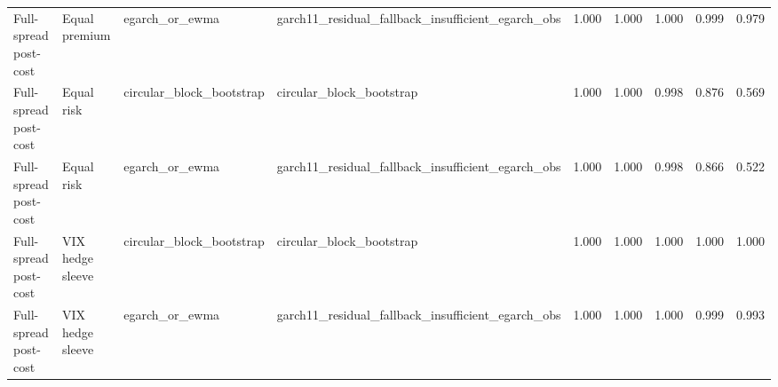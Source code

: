 \begin{tabular}{llllrrrrr}
Full-spread post-cost & Equal premium & egarch\_or\_ewma & garch11\_residual\_fallback\_insufficient\_egarch\_obs & 1.000 & 1.000 & 1.000 & 0.999 & 0.979 \\
Full-spread post-cost & Equal risk & circular\_block\_bootstrap & circular\_block\_bootstrap & 1.000 & 1.000 & 0.998 & 0.876 & 0.569 \\
Full-spread post-cost & Equal risk & egarch\_or\_ewma & garch11\_residual\_fallback\_insufficient\_egarch\_obs & 1.000 & 1.000 & 0.998 & 0.866 & 0.522 \\
Full-spread post-cost & VIX hedge sleeve & circular\_block\_bootstrap & circular\_block\_bootstrap & 1.000 & 1.000 & 1.000 & 1.000 & 1.000 \\
Full-spread post-cost & VIX hedge sleeve & egarch\_or\_ewma & garch11\_residual\_fallback\_insufficient\_egarch\_obs & 1.000 & 1.000 & 1.000 & 0.999 & 0.993 \\
\bottomrule
\end{tabular}
